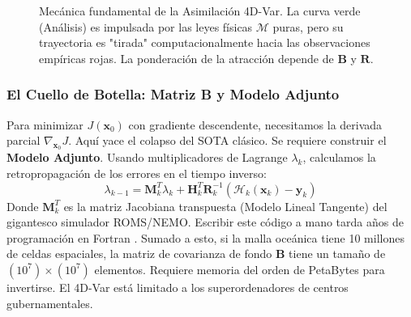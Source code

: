 \documentclass[11pt,a4paper]{article}
\begin{document}
\begin{figure}[h!]
\centering
{}
\vspace{0.3cm}
\caption{Mecánica fundamental de la Asimilación 4D-Var. La curva verde (Análisis) es impulsada por las leyes físicas $\mathcal{M}$ puras, pero su trayectoria es "tirada" computacionalmente hacia las observaciones empíricas rojas. La ponderación de la atracción depende de $\mathbf{B}$ y $\mathbf{R}$.}
\end{figure}

\subsubsection{El Cuello de Botella: Matriz B y Modelo Adjunto}
Para minimizar $J(\mathbf{x}_0)$ con gradiente descendente, necesitamos la derivada parcial $\nabla_{\mathbf{x}_0} J$. Aquí yace el colapso del SOTA clásico. Se requiere construir el \textbf{Modelo Adjunto}.
Usando multiplicadores de Lagrange $\lambda_k$, calculamos la retropropagación de los errores en el tiempo inverso:
\begin{equation}
\lambda_{k-1} = \mathbf{M}_k^T \lambda_k + \mathbf{H}_k^T \mathbf{R}_k^{-1} (\mathcal{H}_k(\mathbf{x}_k) - \mathbf{y}_k)
\end{equation}
Donde $\mathbf{M}_k^T$ es la matriz Jacobiana transpuesta (Modelo Lineal Tangente) del gigantesco simulador ROMS/NEMO. Escribir este código a mano tarda años de programación en Fortran \cite{brajard2024}.
Sumado a esto, si la malla oceánica tiene 10 millones de celdas espaciales, la matriz de covarianza de fondo $\mathbf{B}$ tiene un tamaño de $(10^7) \times (10^7)$ elementos. Requiere memoria del orden de PetaBytes para invertirse.
El 4D-Var está limitado a los superordenadores de centros gubernamentales.
\end{document}
